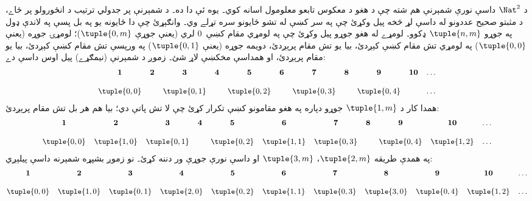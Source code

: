 \documentclass[../../../include/open-logic-section]{subfiles}
\begin{document}


\begin{explain}
د $\Nat^2$ داسې نورې شمېرنې هم شته چې د هغو د معکوس تابعو
معلومول اسانه کوي۔ يوه ئې دا ده۔ د شمېرنې پر جدولي ترتيب د
انځورولو پر ځاے، د مثبتو صحيح عددونو له داسې لړ څخه پيل وکړئ
چې په سر کښې له تشو ځايونو سره تړلے وي۔ وانګېړئ چې دا ځايونه
يو په بل پسې په لاندې ډول په جوړو $\tuple{n,m}$ ډکوو۔ لومړے
له هغو جوړو پيل وکړئ چې په لومړي مقام کښې~$0$ لري (يعنې جوړې
$\tuple{0,m}$)؛ لومړۍ جوړه (يعنې $\tuple{0,0}$) په لومړي تش
مقام کښې کېږدئ، بيا يو تش مقام پرېږدئ، دويمه جوړه (يعنې
$\tuple{0,1}$) په ورپسې تش مقام کښې کېږدئ، بيا يو مقام پرېږدئ،
او همداسې مخکښې لاړ شئ۔
زموږ د شمېرنې (نيمګړے) پيل اوس داسې دے:
\[\small
\begin{array}{@{}c c c c c c c c c c c@{}}
\mathbf 1 & \mathbf 2 & \mathbf 3 & \mathbf 4 & \mathbf 5 & \mathbf 6 & \mathbf 7 & \mathbf 8 & \mathbf 9 & \mathbf{10} & \dots \\ \\
\tuple{0,0} &  & \tuple{0,1} &  & \tuple{0,2} &  & \tuple{0,3} & & \tuple{0,4} &  & \dots \\
\end{array}
\]
همدا کار د $\tuple{1,m}$ جوړو دپاره په هغو مقامونو کښې تکرار
کړئ چې لا تش پاتې دي؛ بيا هم هر بل تش مقام پرېږدئ:
\[\small
\begin{array}{@{}c c c c c c c c c c c@{}}
\mathbf 1 & \mathbf 2 & \mathbf 3 & \mathbf 4 & \mathbf 5 & \mathbf 6 & \mathbf 7 & \mathbf 8 & \mathbf 9 & \mathbf{10} & \dots \\ \\
\tuple{0,0} & \tuple{1,0} & \tuple{0,1} &  & \tuple{0,2} & \tuple{1,1} & 
\tuple{0,3} & & \tuple{0,4} &  \tuple{1,2} & \dots \\
\end{array}
\]
په همدې طريقه $\tuple{2,m}$، $\tuple{3,m}$ او داسې نورې جوړې
ور دننه کړئ۔
نو زموږ بشپړه شمېرنه
داسې پيلېږي:
\[\small
\begin{array}{@{}cc c c c c c c c c c@{}}
\mathbf 1 & \mathbf 2 & \mathbf 3 & \mathbf 4 & \mathbf 5 & \mathbf 6 & \mathbf 7 & \mathbf 8 & \mathbf 9 & \mathbf{10} & \dots \\ \\
\tuple{0,0} & \tuple{1,0} & \tuple{0,1} & \tuple{2,0}  & \tuple{0,2} & 
\tuple{1,1} & \tuple{0,3} & \tuple{3,0}  & \tuple{0,4} &  \tuple{1,2} & \dots \\
\end{array}
\]

\end{explain}
\end{document}
